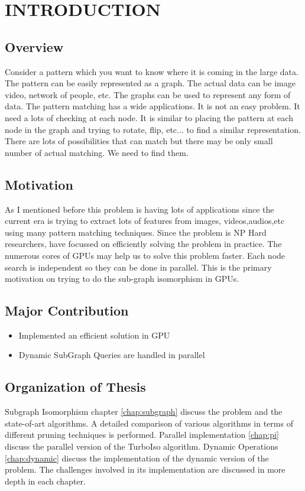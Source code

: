 \chapter{INTRODUCTION}
\label{chap:intro}
\section{Overview}
\hspace{10mm}Consider  a pattern which you want to know where it is coming in the large data. The pattern can be easily represented as a graph. The actual data can be image video, network of people, etc. The graphs can be used to represent any form of data. The pattern matching has a wide applications. It is not an easy problem. It need a lots of checking at each node. It is similar to placing the pattern at each node in the graph and trying to rotate, flip, etc... to find a similar representation. There are lots of possibilities that can match but there may be only small number of actual matching. We need to find them.
\section{Motivation}
\hspace{10mm}As I mentioned before this problem is having lots of applications since the current era is trying to extract lots of features from images, videos,audios,etc using many pattern matching techniques.  Since the problem is NP Hard researchers, have focussed on efficiently solving the problem in practice. The numerous cores of GPUs may help us to solve this problem faster. Each node search is independent so they can be done in parallel. This is the  primary motivation on trying to do the sub-graph isomorphism in GPUs. 
\section{Major Contribution}
\begin{itemize}
	\item{Implemented an efficient solution in GPU}
	\item{Dynamic SubGraph Queries are handled in parallel}
\end{itemize}

\section{Organization of Thesis}
	\hspace{10mm}Subgraph Isomorphism chapter \ref{chap:subgraph} discuss the problem and the state-of-art algorithms. A detailed comparison of various algorithms in terms of different pruning techniques is performed. Parallel implementation \ref{chap:pi} discuss the parallel version of the TurboIso algorithm. Dynamic Operations \ref{chap:dynamic} discuss the implementation of the dynamic version of the problem. The challenges involved in its implementation are discussed in more depth in each chapter.